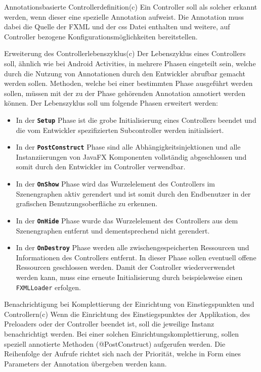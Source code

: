 \begin{freq}{Annotationsbasierte Controllerdefinition}(c)
	Ein Controller soll als solcher erkannt werden, wenn dieser eine spezielle Annotation aufweist. Die Annotation muss dabei die Quelle der FXML und der \ac{css} Datei enthalten und weitere, auf Controller bezogene Konfigurationsmöglichkeiten bereitstellen.
\end{freq}
\begin{freq}{Erweiterung des Controllerlebenszyklus}(c)
	Der Lebenszyklus eines Controllers soll, ähnlich wie bei Android Activities, in mehrere Phasen eingeteilt sein, welche durch die Nutzung von Annotationen durch den Entwickler abrufbar gemacht werden sollen. Methoden, welche bei einer bestimmten Phase ausgeführt werden sollen, müssen mit der zu der Phase gehörenden Annotation annotiert werden können. Der Lebenszyklus soll um folgende Phasen erweitert werden:
	\begin{itemize}
		\item In der \textbf{\texttt{Setup}} Phase ist die grobe Initialisierung eines Controllers beendet und die vom Entwickler spezifizierten Subcontroller werden initialisiert.
		\item In der \textbf{\texttt{PostConstruct}} Phase sind alle Abhängigkeitsinjektionen und alle Instanziierungen von JavaFX Komponenten vollständig abgeschlossen und somit durch den Entwickler im Controller verwendbar.
		\item In der \textbf{\texttt{OnShow}} Phase wird das Wurzelelement des Controllers im Szenengraphen aktiv gerendert und ist somit durch den Endbenutzer in der grafischen Benutzungsoberfläche zu erkennen.
		\item In der \textbf{\texttt{OnHide}} Phase wurde das Wurzelelement des Controllers aus dem Szenengraphen entfernt und dementsprechend nicht gerendert.
		\item In der \textbf{\texttt{OnDestroy}} Phase werden alle zwischengespeicherten Ressourcen und Informationen des Controllers entfernt. In dieser Phase sollen eventuell offene Ressourcen geschlossen werden. Damit der Controller wiederverwendet werden kann, muss eine erneute Initialisierung durch beispielsweise einen \texttt{FXMLLoader} erfolgen.
	\end{itemize}
\end{freq}
\begin{freq}{Benachrichtigung bei Komplettierung der Einrichtung von Einstiegspunkten und Controllern}(c)
	Wenn die Einrichtung des Einstiegspunktes der Applikation, des Preloaders oder der Controller beendet ist, soll die jeweilige Instanz benachrichtigt werden. Bei einer solchen Einrichtungskomplettierung, sollen speziell annotierte Methoden (@PostConstruct) aufgerufen werden. Die Reihenfolge der Aufrufe richtet sich nach der Priorität, welche in Form eines Parameters der Annotation übergeben werden kann.
\end{freq}
